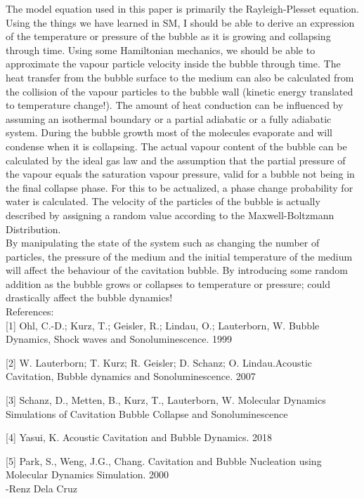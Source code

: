 \documentclass[12pt, letterpaper, oneside, article]{memoir}
\begin{document}
The model equation used in this paper is primarily the Rayleigh-Plesset equation. Using the things we have learned in SM, I should be able to derive an expression of the temperature or pressure of the bubble as it is growing and collapsing through time. Using some Hamiltonian mechanics, we should be able to approximate the vapour particle velocity inside the bubble through time. The heat transfer from the bubble surface to the medium can also be calculated from the collision of the vapour particles to the bubble wall (kinetic energy translated to temperature change!). The amount of heat conduction can be influenced by assuming an isothermal boundary or a partial adiabatic or a fully adiabatic system. During the bubble growth most of the molecules evaporate and will condense when it is collapsing. The actual vapour content of the bubble can be calculated by the ideal gas law and the assumption that the partial pressure of the vapour equals the saturation vapour pressure, valid for a bubble not being in the final collapse phase. For this to be actualized, a phase change probability for water is calculated. The velocity of the particles of the bubble is actually described by assigning a random value according to the Maxwell-Boltzmann Distribution. \\By manipulating the state of the system such as changing the number of particles, the pressure of the medium and the initial temperature of the medium will affect the behaviour of the cavitation bubble. By introducing some random addition as the bubble grows or collapses to temperature or pressure; could drastically affect the bubble dynamics!\\


References:\\

[1] Ohl, C.-D.; Kurz, T.; Geisler, R.; Lindau, O.; Lauterborn, W. Bubble Dynamics, Shock waves and Sonoluminescence. 1999

[2] W. Lauterborn; T. Kurz; R. Geisler; D. Schanz; O. Lindau.Acoustic Cavitation, Bubble dynamics and Sonoluminescence. 2007

[3] Schanz, D., Metten, B., Kurz, T., Lauterborn, W. Molecular Dynamics Simulations of Cavitation Bubble Collapse and Sonoluminescence

[4] Yasui, K. Acoustic Cavitation and Bubble Dynamics. 2018

[5] Park, S., Weng, J.G., Chang. Cavitation and Bubble Nucleation using Molecular Dynamics Simulation. 2000\\

-Renz Dela Cruz
\end{document}
